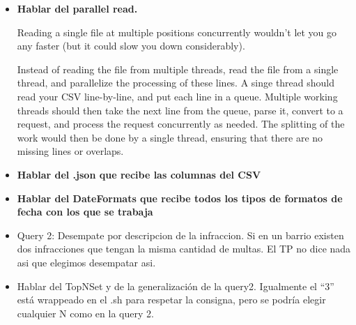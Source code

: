 \documentclass[a4paper,12pt]{article}
\begin{document}
	\begin{itemize}
		\item \textbf{Hablar del parallel read.}
		
		Reading a single file at multiple positions concurrently wouldn't let you go any faster (but it could slow you down considerably).
		
		Instead of reading the file from multiple threads, read the file from a single thread, and parallelize the processing of these lines. A singe thread should read your CSV line-by-line, and put each line in a queue. Multiple working threads should then take the next line from the queue, parse it, convert to a request, and process the request concurrently as needed. The splitting of the work would then be done by a single thread, ensuring that there are no missing lines or overlaps. 
		
		\item \textbf{Hablar del .json que recibe las columnas del CSV}
		
		\item \textbf{Hablar del DateFormats que recibe todos los tipos de formatos de fecha con los que se trabaja}
		
		\item Query 2: Desempate por descripcion de la infraccion. Si en un barrio existen dos infracciones que tengan la misma cantidad de multas. El TP no dice nada asi que elegimos desempatar asi. 
		
		\item Hablar del TopNSet y de la generalización de la query2. Igualmente el ``3'' está wrappeado en el .sh para respetar la consigna, pero se podría elegir cualquier N como en la query 2.
	\end{itemize}
	
	
\end{document}
